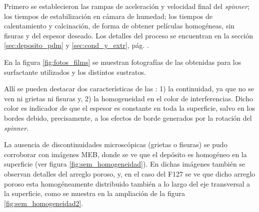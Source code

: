 		 Primero se establecieron las rampas de aceleración y velocidad final del \textit{spinner}; los tiempos de estabilización en cámara de humedad; los tiempos de calentamiento y calcinación, de forma de obtener películas homogéneas, sin fisuras y del espesor deseado. Los detalles del proceso se encuentran en la sección \ref{sec:deposito_pdm} y \ref{sec:cond_y_extr}, pág. \pageref{sec:deposito_pdm}. 

	     En la figura \ref{fig:fotos_films} se muestran fotografías de las \pdm\space obtenidas para los surfactante utilizados y los distintos sustratos. 


		 Allí se pueden destacar dos características de las \pdm: 1) la continuidad, ya que no se ven ni grietas ni fisuras y, 2) la homogeneidad en el color de interferencias. Dicho color es indicador de que el espesor es constante en toda la superficie, salvo en los bordes debido, precisamente, a los efectos de borde generados por la rotación del \textit{spinner}\cite{Franssila2004,Jaeger2001}.

		 La ausencia de discontinuidades microscópicas (grietas o fisuras) se pudo corroborar con imágenes MEB, donde se ve que el depósito es homogéneo en la superficie (ver figura \ref{fig:sem_homogeneidad}). En dichas imágenes también se observan detalles del arreglo poroso, y, en el caso del F127 se ve que dicho arreglo poroso esta homogéneamente distribuido también a lo largo del eje transversal a la superficie, como se muestra en la ampliación de la figura \ref{fig:sem_homogeneidad2}.
		

